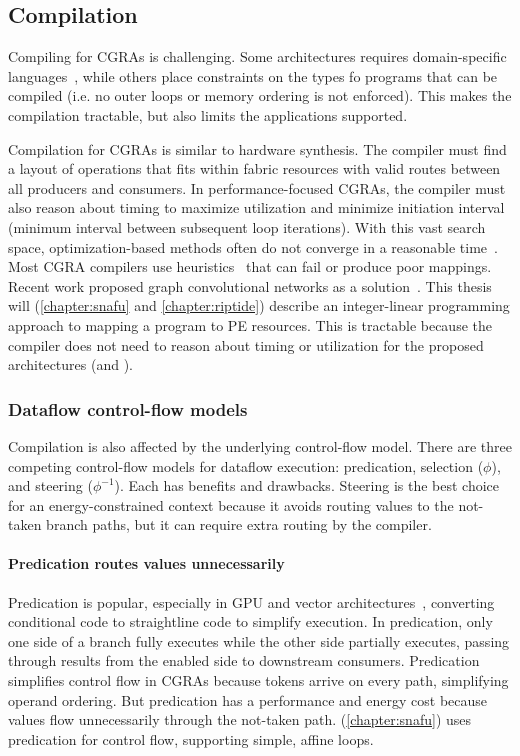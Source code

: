 \subsection{Compilation}
Compiling for CGRAs is challenging.
% 
Some architectures requires domain-specific languages~\cite{id,delite}, while others place constraints on the types fo programs that can be compiled (i.e. no outer loops or memory ordering is not enforced).
% 
This makes the compilation tractable, but also limits the applications supported.

Compilation for CGRAs is similar to hardware synthesis.
% 
The compiler must find a layout of
operations that fits within fabric resources with valid routes between
all producers and consumers.
%
In performance-focused CGRAs, the compiler must also reason
about timing to maximize utilization and minimize
initiation interval (minimum interval between subsequent loop iterations).
%
With this vast search space, optimization-based methods often
do not converge in a reasonable time~\cite{hybrid-sched,nowatzki2013general}.
%
Most CGRA compilers use heuristics~\cite{opencgra,revamp,park2008edge,mei2002dresc,dora,nowatzki2013general,hybrid-sched,weng2020dsagen} that can 
fail or produce poor mappings.
%
Recent work proposed graph convolutional networks as a
solution~\cite{mirhoseini2020chip}.
% 
This thesis will (\autoref{chapter:snafu} and \autoref{chapter:riptide}) describe an integer-linear programming approach to mapping a program to PE resources.
% 
This is tractable because the compiler does not need to reason about timing or
utilization for the proposed architectures (\snafu and \riptide).

\subsubsection{Dataflow control-flow models}
Compilation is also affected by the underlying control-flow model.
% 
There are three competing control-flow models for dataflow execution: predication, selection ($\phi$), and steering ($\phi^{-1}$).
% 
Each has benefits and drawbacks. 
% 
Steering is the best choice for an energy-constrained context because it avoids routing values to the not-taken branch paths, but it can require extra routing by the compiler.

\paragraph{Predication routes values unnecessarily}
Predication is popular, especially in GPU and vector
architectures~\cite{avx,hennessy2011computer}, converting conditional code to
straightline code to simplify execution.
% 
In predication, only one side of a branch fully executes while the other side partially executes, passing through results from the enabled side to downstream consumers.
%
Predication simplifies control flow in CGRAs because tokens arrive
on every path, simplifying operand ordering.
%
But predication has a performance and energy cost because values flow
unnecessarily through the not-taken path.
%
\snafu (\autoref{chapter:snafu}) uses predication for control flow, supporting simple, affine loops.

